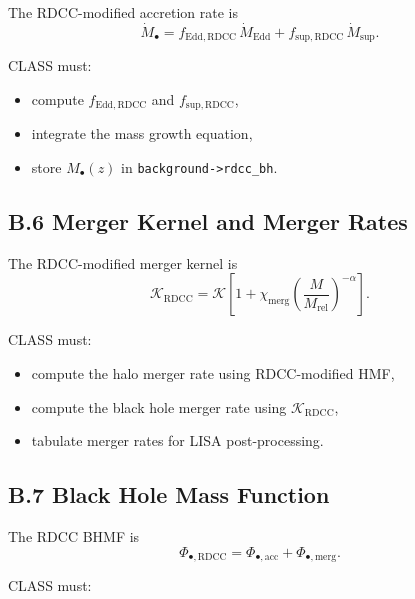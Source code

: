 \documentclass[11pt,a4paper]{article}
\begin{document}
The RDCC-modified accretion rate is
\begin{equation}
    \dot{M}_{\bullet}
    = f_{\mathrm{Edd,RDCC}}\,\dot{M}_{\mathrm{Edd}}
      + f_{\mathrm{sup,RDCC}}\,\dot{M}_{\mathrm{sup}}.
\end{equation}

CLASS must:

\begin{itemize}
    \item compute $f_{\mathrm{Edd,RDCC}}$ and $f_{\mathrm{sup,RDCC}}$,
    \item integrate the mass growth equation,
    \item store $M_{\bullet}(z)$ in \texttt{background->rdcc\_bh}.
\end{itemize}

\subsection*{B.6 Merger Kernel and Merger Rates}

The RDCC-modified merger kernel is
\begin{equation}
    \mathcal{K}_{\mathrm{RDCC}}
    = \mathcal{K}
      \left[
        1 + \chi_{\mathrm{merg}}
        \left(\frac{M}{M_{\mathrm{rel}}}\right)^{-\alpha}
      \right].
\end{equation}

CLASS must:

\begin{itemize}
    \item compute the halo merger rate using RDCC-modified HMF,
    \item compute the black hole merger rate using $\mathcal{K}_{\mathrm{RDCC}}$,
    \item tabulate merger rates for LISA post-processing.
\end{itemize}

\subsection*{B.7 Black Hole Mass Function}

The RDCC BHMF is
\begin{equation}
    \Phi_{\bullet,\mathrm{RDCC}}
    = \Phi_{\bullet,\mathrm{acc}}
    + \Phi_{\bullet,\mathrm{merg}}.
\end{equation}

CLASS must:
\end{document}
